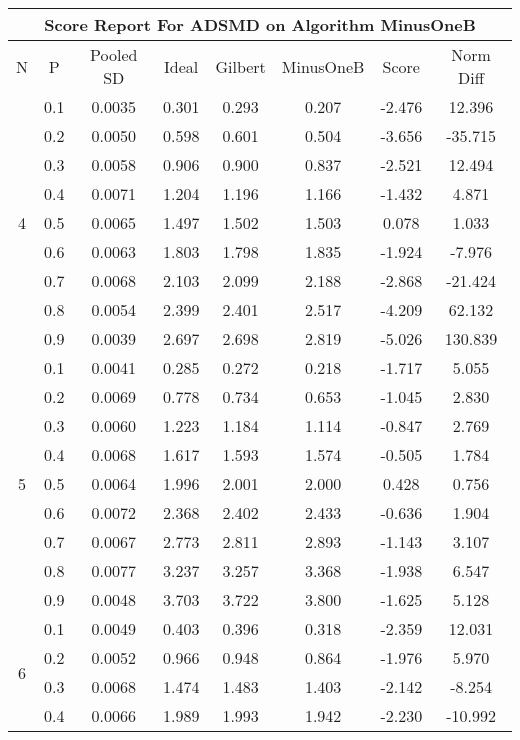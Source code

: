 \documentclass[11pt,a4paper]{report}
\begin{document}
\begin{longtable}{ | c | c || c | c | c | c | c | c | }
\hline
\multicolumn{8}{|c|}{ Score Report For ADSMD on Algorithm MinusOneB} \\
\hline
N & P & Pooled SD &  Ideal &  Gilbert & MinusOneB  & Score & Norm Diff \\
 \hline
 \hline
 \endhead
\multirow{9}{*}{4} & 0.1 & 0.0035 & 0.301 & 0.293 & 0.207 & -2.476 & 12.396 \\
 & 0.2 & 0.0050 & 0.598 & 0.601 & 0.504 & -3.656 & -35.715 \\
 & 0.3 & 0.0058 & 0.906 & 0.900 & 0.837 & -2.521 & 12.494 \\
 & 0.4 & 0.0071 & 1.204 & 1.196 & 1.166 & -1.432 & 4.871 \\
 & 0.5 & 0.0065 & 1.497 & 1.502 & 1.503 & 0.078 & 1.033 \\
 & 0.6 & 0.0063 & 1.803 & 1.798 & 1.835 & -1.924 & -7.976 \\
 & 0.7 & 0.0068 & 2.103 & 2.099 & 2.188 & -2.868 & -21.424 \\
 & 0.8 & 0.0054 & 2.399 & 2.401 & 2.517 & -4.209 & 62.132 \\
 & 0.9 & 0.0039 & 2.697 & 2.698 & 2.819 & -5.026 & 130.839 \\
 \hline
\multirow{9}{*}{5} & 0.1 & 0.0041 & 0.285 & 0.272 & 0.218 & -1.717 & 5.055 \\
 & 0.2 & 0.0069 & 0.778 & 0.734 & 0.653 & -1.045 & 2.830 \\
 & 0.3 & 0.0060 & 1.223 & 1.184 & 1.114 & -0.847 & 2.769 \\
 & 0.4 & 0.0068 & 1.617 & 1.593 & 1.574 & -0.505 & 1.784 \\
 & 0.5 & 0.0064 & 1.996 & 2.001 & 2.000 & 0.428 & 0.756 \\
 & 0.6 & 0.0072 & 2.368 & 2.402 & 2.433 & -0.636 & 1.904 \\
 & 0.7 & 0.0067 & 2.773 & 2.811 & 2.893 & -1.143 & 3.107 \\
 & 0.8 & 0.0077 & 3.237 & 3.257 & 3.368 & -1.938 & 6.547 \\
 & 0.9 & 0.0048 & 3.703 & 3.722 & 3.800 & -1.625 & 5.128 \\
 \hline
\multirow{9}{*}{6} & 0.1 & 0.0049 & 0.403 & 0.396 & 0.318 & -2.359 & 12.031 \\
 & 0.2 & 0.0052 & 0.966 & 0.948 & 0.864 & -1.976 & 5.970 \\
 & 0.3 & 0.0068 & 1.474 & 1.483 & 1.403 & -2.142 & -8.254 \\
 & 0.4 & 0.0066 & 1.989 & 1.993 & 1.942 & -2.230 & -10.992 \\

\end{longtable}
\end{document}
